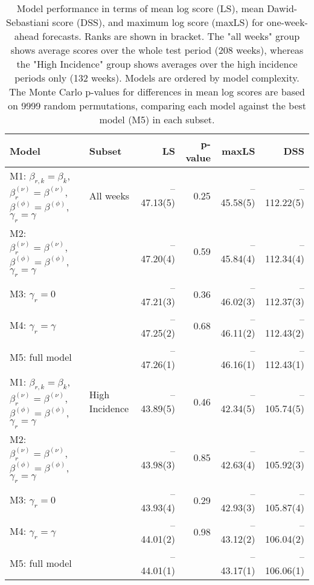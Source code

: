 \begin{table}[ht]
\centering
\begingroup\fontsize{9pt}{10pt}\selectfont
\begin{tabular}{ll|rrrr}
  \hline
Model & Subset & LS & p-value & maxLS & DSS \\ 
  \hline
M1: $\beta_{r,k} = \beta_{k}$, $\beta_{r}^{(\nu)} = \beta^{(\nu)}$, $\beta^{(\phi)} = \beta^{(\phi)}$, $\gamma_r = \gamma$ & All weeks & --47.13(5) & 0.25 & --45.58(5) & --112.22(5) \\ 
  M2: $\beta_{r}^{(\nu)} = \beta^{(\nu)}$, $\beta^{(\phi)} = \beta^{(\phi)}$, $\gamma_r = \gamma$ &  & --47.20(4) & 0.59 & --45.84(4) & --112.34(4) \\ 
  M3: $\gamma_r = 0$ &  & --47.21(3) & 0.36 & --46.02(3) & --112.37(3) \\ 
  M4: $\gamma_r = \gamma$ &  & --47.25(2) & 0.68 & --46.11(2) & --112.43(2) \\ 
  M5: full model &  & --47.26(1) &  & --46.16(1) & --112.43(1) \\ 
   \hline
M1: $\beta_{r,k} = \beta_{k}$, $\beta_{r}^{(\nu)} = \beta^{(\nu)}$, $\beta^{(\phi)} = \beta^{(\phi)}$, $\gamma_r = \gamma$ & High Incidence & --43.89(5) & 0.46 & --42.34(5) & --105.74(5) \\ 
  M2: $\beta_{r}^{(\nu)} = \beta^{(\nu)}$, $\beta^{(\phi)} = \beta^{(\phi)}$, $\gamma_r = \gamma$ &  & --43.98(3) & 0.85 & --42.63(4) & --105.92(3) \\ 
  M3: $\gamma_r = 0$ &  & --43.93(4) & 0.29 & --42.93(3) & --105.87(4) \\ 
  M4: $\gamma_r = \gamma$ &  & --44.01(2) & 0.98 & --43.12(2) & --106.04(2) \\ 
  M5: full model &  & --44.01(1) &  & --43.17(1) & --106.06(1) \\ 
   \hline
\end{tabular}
\endgroup
\caption{Model performance in terms of mean log score (LS),
             mean Dawid-Sebastiani score (DSS), and maximum log score (maxLS)
             for one-week-ahead forecasts.
             Ranks are shown in bracket.
             The "all weeks" group shows average scores over the
             whole test period (208 weeks),
             whereas the "High Incidence" group shows
             averages over the high incidence periods only (132 weeks).
             Models are ordered by model complexity.
             The Monte Carlo p-values for differences in mean log scores
             are based on 9999 random permutations,
             comparing each model against the best model (M5) in each subset.} 
\label{tab:forecast}
\end{table}
